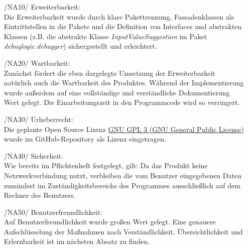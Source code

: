 \documentclass[parskip=full]{scrartcl}
\begin{document}
		\begin{itemize}
		\item[/NA10/]Erweiterbarkeit: \\
		Die Erweiterbarkeit wurde durch klare Pakettrennung, Fassadenklassen als Eintrittstellen in die Pakete und die Definition von Interfaces und abstrakten Klassen (z.B. die abstrakte Klasse \textit{InputValueSuggestion} im Paket \textit{debuglogic.debugger}) sichergestellt und erleichtert.
		\item[/NA20/]Wartbarkeit: \\
		Zunächst fördert die eben dargelegte Umsetzung der Erweiterbarkeit natürlich auch die Wartbarkeit des Produktes. Während der Implementierung wurde außerdem auf eine vollständige und verständliche Dokumentierung Wert gelegt. Die Einarbeitungszeit in den Programmcode wird so verringert.
		\item[/NA30/]Urheberrecht: \\
		Die geplante Open Source Lizenz \href{https://www.gnu.org/licenses/gpl-3.0.de.html}{GNU GPL 3 (GNU General Public License)} wurde im GitHub-Repository als Lizenz eingetragen.
		
		\item[/NA40/] Sicherheit: \\
		Wie bereits im Pflichtenheft festgelegt, gilt: Da das Produkt keine Netzwerkverbindung nutzt, verbleiben die vom Benutzer eingegebenen Daten zumindest im Zuständigkeitsbereichs des Programmes ausschließlich auf dem Rechner des Benutzers.
		\item[/NA50/]Benutzerfreundlichkeit: \\
		Auf Benutzerfreundlichkeit wurde großen Wert gelegt. Eine genauere Aufschlüsselung der Maßnahmen nach Verständlichkeit, Übersichtlichkeit und Erlernbarkeit ist im nächsten Absatz zu finden.
		\end{itemize}
		
\end{document}
